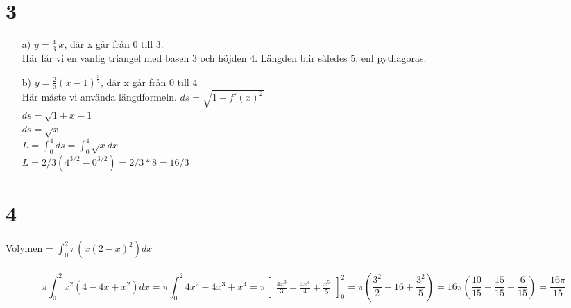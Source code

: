 \documentclass{article}
\begin{document}
\section*{3}
\begin{itemize}
	\item[a) ] $y = \frac{4}{3} \> x$, där x går från 0 till 3. \\
			 Här får vi en vanlig triangel med basen 3 och höjden 4. Längden blir således 5, enl pythagoras. 
			 
	\item[b) ] 	$y = \frac{2}{3} (x-1)^{ \frac{3}{2} }$, där x går från 0 till 4 \\
				Här måste vi använda längdformeln. 
				$ds = \sqrt{1 + f'(x)^2}$ \\
				$ds = \sqrt{1 + x-1} $ \\
				$ds = \sqrt{x} $ \\
				$L = \int_{0}^{4} ds = \int_{0}^{4} \sqrt{x} dx $ \\
				$L =  2/3 ( 4^{3/2} - 0^{3/2} ) = 2/3 * 8 = 16/3 $
\end{itemize}


\section*{4}
Volymen = $\int_0^2 \pi(x(2-x)^2)dx$\\\\
$$\pi \int_0^2 x^2(4-4x+x^2)dx = 
\pi \int_0^2 4x^2-4x^3+x^4 = 
\pi \begin{bmatrix} \frac{4x^3}{3} - \frac{4x^4}{4} + \frac{x^5}{5} \end{bmatrix}_0^2 = 
\pi (\frac{3^2}{2} - 16 + \frac{3^2}{5}) = 
16 \pi(\frac{10}{15} - \frac{15}{15} + \frac{6}{15}) = 
\frac{16 \pi}{15}$$
\end{document}
